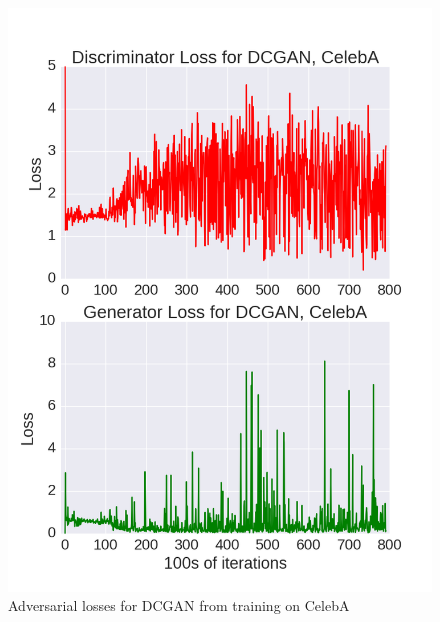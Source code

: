 \documentclass{article}
\begin{document}
\begin{figure}[!htb]%
  \centering
  \includegraphics[width=.85\linewidth]{figures/Loss_Graph_CelebA_T=1.png}
  \caption{Adversarial losses for DCGAN from training on CelebA}
  \label{fig3}
\end{figure}
\end{document}
